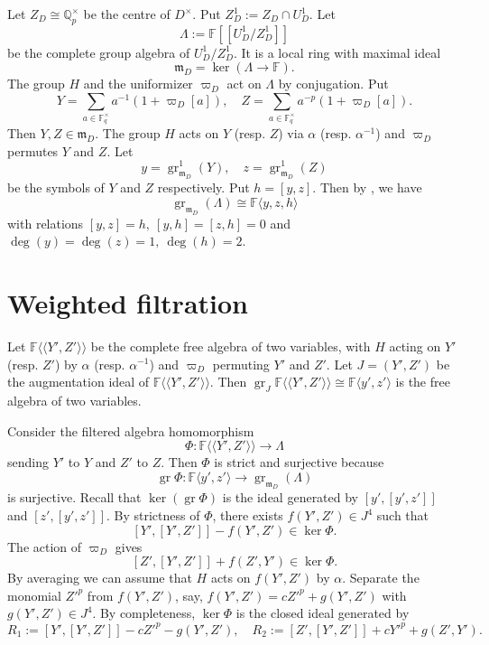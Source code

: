 \documentclass[11pt,a4paper]{article} %
\def\FF{\mathbb{F}}
\def\deg{\operatorname{deg}}
\def\gr{\operatorname{gr}}
\def\Qp{\mathbb{Q}_p}
\begin{document}
Let $Z_D\cong\Qp^\times$ be the centre of $D^{\times}$. Put $Z_D^1:=Z_D\cap U_D^1$. Let 
\[
\Lambda:=\FF[[U_D^1/Z_D^1]]
\]
be the complete group algebra of $U_D^1/Z_D^1$. It is a local ring with maximal ideal 
\[
\mathfrak{m}_D=\ker(\Lambda\rightarrow \mathbb{F}).
\]
The group $H$ and the uniformizer $\varpi_D$ act on $\Lambda$ by conjugation. Put
\begin{equation}\label{eq:YZ}
 Y=\sum_{a\in\FF_q^\times}a^{-1}(1+\varpi_D[a]),\quad
 Z=\sum_{a\in\FF_q^\times}a^{-p}(1+\varpi_D[a]).
\end{equation}
Then $Y,Z\in\mathfrak{m}_D$. The group $H$ acts on $Y$ (resp. $Z$) via $\alpha$ (resp. $\alpha^{-1}$) and $\varpi_D$ permutes $Y$ and $Z$. Let 
\[
y=\gr_{\mathfrak{m}_D}^1(Y),\quad z=\gr_{\mathfrak{m}_D}^1(Z)
\]
be the symbols of $Y$ and $Z$ respectively. Put $h=[y,z]$. Then by \cite[\S2.2, 2.3]{HW24b}, we have 
\[
\gr_{\mathfrak{m}_D}(\Lambda)\cong\FF\langle y,z,h\rangle
\]
with relations $[y,z]=h,~[y,h]=[z,h]=0$ and $\deg (y)=\deg(z)=1,~\deg(h)=2$.

\section{Weighted filtration}\label{sec:weighted-filtration}

Let $\FF\langle\langle Y',Z'\rangle\rangle$ be the complete free algebra of two variables, with $H$ acting on $Y'$ (resp. $Z'$) by $\alpha$ (resp. $\alpha^{-1}$) and $\varpi_D$ permuting $Y'$ and $Z'$. Let $J=(Y',Z')$ be the augmentation ideal of $\FF\langle\langle Y',Z'\rangle\rangle$. Then $\gr_J\FF\langle\langle Y',Z'\rangle\rangle\cong\FF\langle y',z'\rangle$ is the free algebra of two variables. 

Consider the filtered algebra homomorphism 
\[
\Phi:\FF\langle\langle Y',Z'\rangle\rangle\longrightarrow\Lambda
\]
sending $Y'$ to $Y$ and $Z'$ to $Z$. Then $\Phi$ is strict and surjective because 
\[
\gr\Phi:\FF\langle y',z'\rangle\longrightarrow\gr_{\mathfrak{m}_D}(\Lambda)
\]
is surjective. Recall that $\ker(\gr\Phi)$ is the ideal generated by $[y',[y',z']]$ and $[z',[y',z']]$. By strictness of $\Phi$, there exists $f(Y',Z')\in J^4$ such that 
\[
[Y',[Y',Z']]-f(Y',Z')\in\ker\Phi.
\]
The action of $\varpi_D$ gives 
\[
[Z',[Y',Z']]+f(Z',Y')\in\ker\Phi.
\]
By averaging we can assume that $H$ acts on $f(Y',Z')$ by $\alpha$. Separate the monomial $Z'^p$ from $f(Y',Z')$, say, $f(Y',Z')=cZ'^p+g(Y',Z')$ with $g(Y',Z')\in J^4$. By completeness, $\ker\Phi$ is the closed ideal generated by 
\begin{equation}\label{eq:Lambda-relation}
   R_1:= [Y',[Y',Z']]-cZ'^p-g(Y',Z'),\quad R_2:=[Z',[Y',Z']]+cY'^p+g(Z',Y').
\end{equation}
\end{document}
